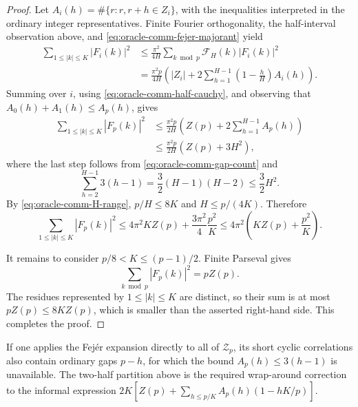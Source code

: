 \begin{proof}
Let \(A_i(h)=\#\{r:r,r+h\in Z_i\}\), with the inequalities interpreted
in the ordinary integer representatives. Finite Fourier orthogonality,
the half-interval observation above, and
\eqref{eq:oracle-comm-fejer-majorant} yield
\begin{align*}
 \sum_{1\le|k|\le K}|F_i(k)|^2
 &\le \frac{\pi^2}{4H}
 \sum_{k\bmod p}\mathcal F_H(k)|F_i(k)|^2\\
 &=\frac{\pi^2p}{4H}
 \left(
 |Z_i|+2\sum_{h=1}^{H-1}
 \left(1-\frac hH\right)A_i(h)
 \right).
\end{align*}
Summing over \(i\), using
\eqref{eq:oracle-comm-half-cauchy}, and observing that
\(A_0(h)+A_1(h)\le A_p(h)\), gives
\begin{align*}
 \sum_{1\le|k|\le K}|F_p(k)|^2
 &\le\frac{\pi^2p}{2H}
 \left(Z(p)+2\sum_{h=1}^{H-1}A_p(h)\right)\\
 &\le\frac{\pi^2p}{2H}
 \left(Z(p)+3H^2\right),
\end{align*}
where the last step follows from
\eqref{eq:oracle-comm-gap-count} and
\[
 \sum_{h=2}^{H-1}3(h-1)
 =\frac32(H-1)(H-2)\le\frac32H^2.
\]
By \eqref{eq:oracle-comm-H-range}, \(p/H\le8K\) and
\(H\le p/(4K)\). Therefore
\[
 \sum_{1\le|k|\le K}|F_p(k)|^2
 \le4\pi^2KZ(p)+\frac{3\pi^2}{4}\frac{p^2}{K}
 \le4\pi^2\left(KZ(p)+\frac{p^2}{K}\right).
\]

It remains to consider \(p/8<K\le(p-1)/2\). Finite Parseval gives
\[
 \sum_{k\bmod p}|F_p(k)|^2=pZ(p).
\]
The residues represented by \(1\le|k|\le K\) are distinct, so their
sum is at most \(pZ(p)\le8KZ(p)\), which is smaller than the asserted
right-hand side. This completes the proof.
\end{proof}

\begin{remark}
If one applies the Fej\'er expansion directly to all of
\(\mathcal Z_p\), its short cyclic correlations also contain ordinary
gaps \(p-h\), for which the bound \(A_p(h)\le3(h-1)\) is unavailable.
The two-half partition above is the required wrap-around correction to
the informal expression
\(2K[Z(p)+\sum_{h\le p/K}A_p(h)(1-hK/p)]\).
\end{remark}
